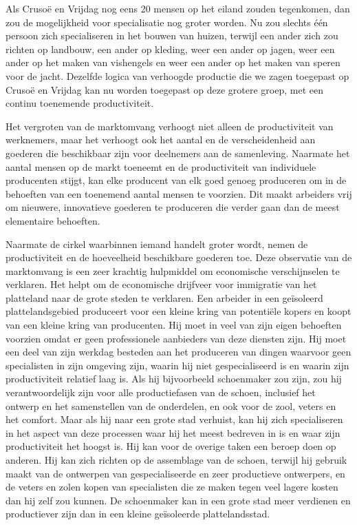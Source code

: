 Als Crusoë en Vrijdag nog eens 20 mensen op het eiland zouden tegenkomen, dan zou de mogelijkheid voor specialisatie nog groter worden. Nu zou slechts één persoon zich specialiseren in het bouwen van huizen, terwijl een ander zich zou richten op landbouw, een ander op kleding, weer een ander op jagen, weer een ander op het maken van vishengels en weer een ander op het maken van speren voor de jacht. Dezelfde logica van verhoogde productie die we zagen toegepast op Crusoë en Vrijdag kan nu worden toegepast op deze grotere groep, met een continu toenemende productiviteit.

Het vergroten van de marktomvang verhoogt niet alleen de productiviteit van werknemers, maar het verhoogt ook het aantal en de verscheidenheid aan goederen die beschikbaar zijn voor deelnemers aan de samenleving. Naarmate het aantal mensen op de markt toeneemt en de productiviteit van individuele producenten stijgt, kan elke producent van elk goed genoeg produceren om in de behoeften van een toenemend aantal mensen te voorzien. Dit maakt arbeiders vrij om nieuwere, innovatieve goederen te produceren die verder gaan dan de meest elementaire behoeften.

Naarmate de cirkel waarbinnen iemand handelt groter wordt, nemen de productiviteit en de hoeveelheid beschikbare goederen toe. Deze observatie van de marktomvang is een zeer krachtig hulpmiddel om economische verschijnselen te verklaren. Het helpt om de economische drijfveer voor immigratie van het platteland naar de grote steden te verklaren. Een arbeider in een geïsoleerd plattelandsgebied produceert voor een kleine kring van potentiële kopers en koopt van een kleine kring van producenten. Hij moet in veel van zijn eigen behoeften voorzien omdat er geen professionele aanbieders van deze diensten zijn. Hij moet een deel van zijn werkdag besteden aan het produceren van dingen waarvoor geen specialisten in zijn omgeving zijn, waarin hij niet gespecialiseerd is en waarin zijn productiviteit relatief laag is. Als hij bijvoorbeeld schoenmaker zou zijn, zou hij verantwoordelijk zijn voor alle productiefasen van de schoen, inclusief het ontwerp en het samenstellen van de onderdelen, en ook voor de zool, veters en het comfort. Maar als hij naar een grote stad verhuist, kan hij zich specialiseren in het aspect van deze processen waar hij het meest bedreven in is en waar zijn productiviteit het hoogst is. Hij kan voor de overige taken een beroep doen op anderen. Hij kan zich richten op de assemblage van de schoen, terwijl hij gebruik maakt van de ontwerpen van gespecialiseerde en zeer productieve ontwerpers, en de veters en zolen kopen van specialisten die ze maken tegen veel lagere kosten dan hij zelf zou kunnen. De schoenmaker kan in een grote stad meer verdienen en productiever zijn dan in een kleine geïsoleerde plattelandsstad.

